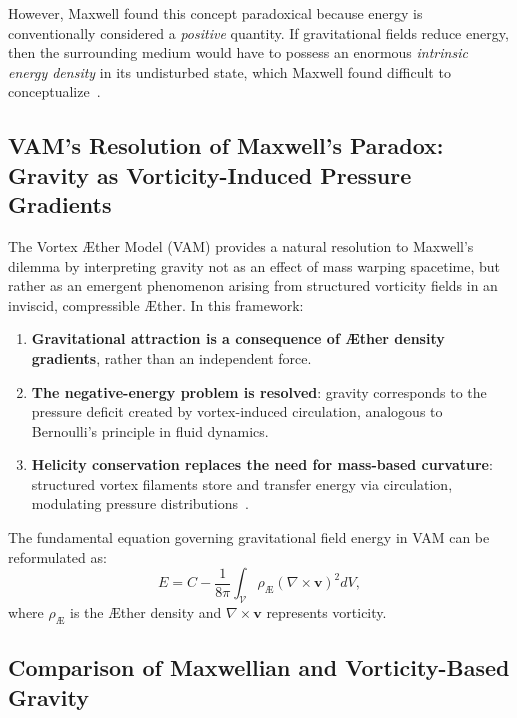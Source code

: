 \documentclass[a4paper,10pt]{article}
\begin{document}
However, Maxwell found this concept paradoxical because energy is conventionally considered a \textit{positive} quantity. If gravitational fields reduce energy, then the surrounding medium would have to possess an enormous \textit{intrinsic energy density} in its undisturbed state, which Maxwell found difficult to conceptualize~\cite{michelson1887}.

\subsection*{VAM's Resolution of Maxwell's Paradox: Gravity as Vorticity-Induced Pressure Gradients}
The Vortex Æther Model (VAM) provides a natural resolution to Maxwell's dilemma by interpreting gravity not as an effect of mass warping spacetime, but rather as an emergent phenomenon arising from structured vorticity fields in an inviscid, compressible Æther. In this framework:
\begin{enumerate}
    \item \textbf{Gravitational attraction is a consequence of Æther density gradients}, rather than an independent force.
    \item \textbf{The negative-energy problem is resolved}: gravity corresponds to the pressure deficit created by vortex-induced circulation, analogous to Bernoulli's principle in fluid dynamics.
    \item \textbf{Helicity conservation replaces the need for mass-based curvature}: structured vortex filaments store and transfer energy via circulation, modulating pressure distributions~\cite{kleckner2016, weiss2021}.
\end{enumerate}

The fundamental equation governing gravitational field energy in VAM can be reformulated as:
\begin{equation*}
    E = C - \frac{1}{8\pi} \int_{\mathcal{V}} \rho_\text{\AE} \left( \nabla \times \mathbf{v} \right)^2 dV,
\end{equation*}
where \( \rho_\text{\AE} \) is the Æther density and \( \nabla \times \mathbf{v} \) represents vorticity.

\subsection*{Comparison of Maxwellian and Vorticity-Based Gravity}
\end{document}
